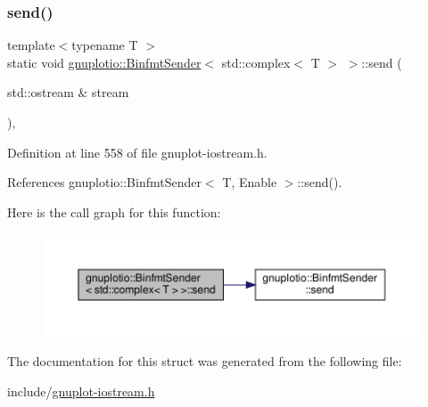 \subsubsection{\texorpdfstring{send()}{send()}}
{\footnotesize\ttfamily template$<$typename T $>$ \\
static void \hyperlink{structgnuplotio_1_1_binfmt_sender}{gnuplotio\+::\+Binfmt\+Sender}$<$ std\+::complex$<$ T $>$ $>$\+::send (\begin{DoxyParamCaption}\item[{std\+::ostream \&}]{stream }\end{DoxyParamCaption})\hspace{0.3cm}{\ttfamily [inline]}, {\ttfamily [static]}}



Definition at line 558 of file gnuplot-\/iostream.\+h.



References gnuplotio\+::\+Binfmt\+Sender$<$ T, Enable $>$\+::send().

Here is the call graph for this function\+:\nopagebreak
\begin{figure}[H]
\begin{center}
\leavevmode
\includegraphics[width=350pt]{structgnuplotio_1_1_binfmt_sender_3_01std_1_1complex_3_01_t_01_4_01_4_a64633d068c93ef2822ee3aa6ef39d623_cgraph}
\end{center}
\end{figure}


The documentation for this struct was generated from the following file\+:\begin{DoxyCompactItemize}
\item 
include/\hyperlink{gnuplot-iostream_8h}{gnuplot-\/iostream.\+h}\end{DoxyCompactItemize}
